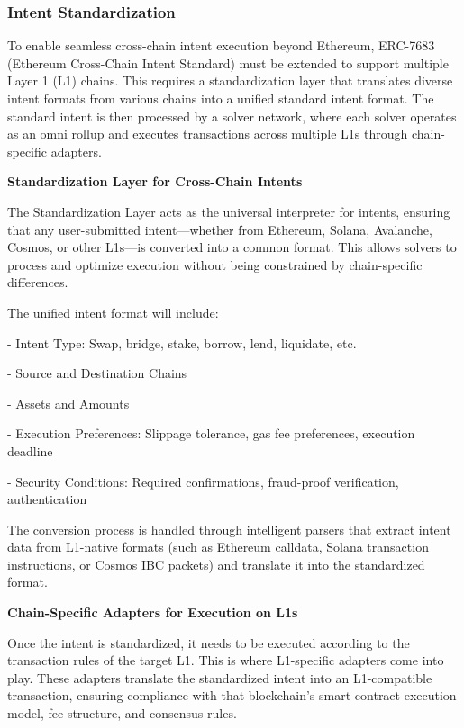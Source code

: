 \subsubsection{Intent Standardization}

To enable seamless cross-chain intent execution beyond Ethereum, ERC-7683 (Ethereum Cross-Chain Intent Standard) must be extended to support multiple Layer 1 (L1) chains. This requires a standardization layer that translates diverse intent formats from various chains into a unified standard intent format. The standard intent is then processed by a solver network, where each solver operates as an omni rollup and executes transactions across multiple L1s through chain-specific adapters.

\noindent
\textbf{Standardization Layer for Cross-Chain Intents}

The Standardization Layer acts as the universal interpreter for intents, ensuring that any user-submitted intent—whether from Ethereum, Solana, Avalanche, Cosmos, or other L1s—is converted into a common format. This allows solvers to process and optimize execution without being constrained by chain-specific differences.

The unified intent format will include:

-   Intent Type: Swap, bridge, stake, borrow, lend, liquidate, etc.

-   Source and Destination Chains
    
-   Assets and Amounts
    
-   Execution Preferences: Slippage tolerance, gas fee preferences, execution deadline
    
-   Security Conditions: Required confirmations, fraud-proof verification, authentication

The conversion process is handled through intelligent parsers that extract intent data from L1-native formats (such as Ethereum calldata, Solana transaction instructions, or Cosmos IBC packets) and translate it into the standardized format.

\noindent
\textbf{Chain-Specific Adapters for Execution on L1s}

Once the intent is standardized, it needs to be executed according to the transaction rules of the target L1. This is where L1-specific adapters come into play. These adapters translate the standardized intent into an L1-compatible transaction, ensuring compliance with that blockchain's smart contract execution model, fee structure, and consensus rules.


